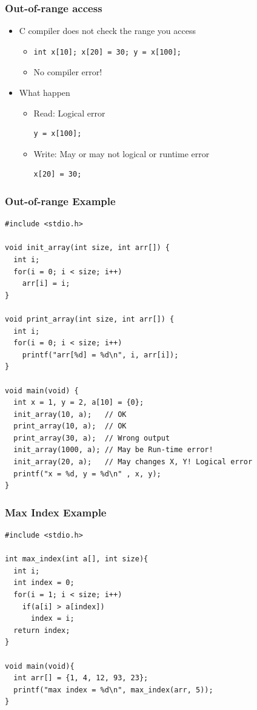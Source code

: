 \documentclass{../c-lecture}
\begin{document}
\begin{frame}[fragile]
  \frametitle{Out-of-range access}
  \begin{itemize}
    \item C compiler does not check the range you access
    \begin{itemize}
      \item[]
      \begin{verbatim}
int x[10]; x[20] = 30; y = x[100];
      \end{verbatim}
      \item No compiler error!
    \end{itemize}
    \item What happen
    \begin{itemize}
      \item Read: Logical error
      \begin{verbatim}
y = x[100];
      \end{verbatim}
      \item Write: May or may not logical or runtime error
      \begin{verbatim}
x[20] = 30;
      \end{verbatim}
    \end{itemize}
  \end{itemize}
\end{frame}

\begin{frame}[fragile]
  \frametitle{Out-of-range Example}
  \scriptsize
  \begin{verbatim}
#include <stdio.h>

void init_array(int size, int arr[]) {
  int i;
  for(i = 0; i < size; i++)
    arr[i] = i;
}

void print_array(int size, int arr[]) {
  int i;
  for(i = 0; i < size; i++)
    printf("arr[%d] = %d\n", i, arr[i]);
}

void main(void) {
  int x = 1, y = 2, a[10] = {0};
  init_array(10, a);   // OK
  print_array(10, a);  // OK
  print_array(30, a);  // Wrong output
  init_array(1000, a); // May be Run-time error!
  init_array(20, a);   // May changes X, Y! Logical error
  printf("x = %d, y = %d\n" , x, y);
}
  \end{verbatim}
\end{frame}

\begin{frame}[fragile]
  \frametitle{Max Index Example}
  \scriptsize
  \begin{verbatim}
#include <stdio.h>

int max_index(int a[], int size){
  int i;
  int index = 0;
  for(i = 1; i < size; i++)
    if(a[i] > a[index])
      index = i;
  return index;
}

void main(void){
  int arr[] = {1, 4, 12, 93, 23};
  printf("max index = %d\n", max_index(arr, 5));
}
  \end{verbatim}
\end{frame}
\end{document}
